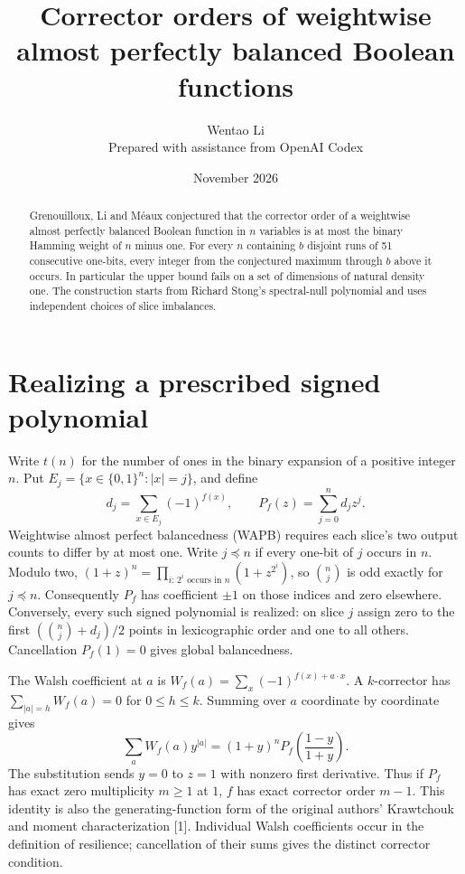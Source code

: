 \documentclass[11pt]{article}
\title{Corrector orders of weightwise almost perfectly balanced Boolean functions}
\author{Wentao Li\\[2pt]\small Prepared with assistance from OpenAI Codex}
\date{November 2026}
\begin{document}
\maketitle
\begin{abstract}
Grenouilloux, Li and M\'eaux conjectured that the corrector order of a weightwise almost perfectly balanced Boolean function in $n$ variables is at most the binary Hamming weight of $n$ minus one. For every $n$ containing $b$ disjoint runs of 51 consecutive one-bits, every integer from the conjectured maximum through $b$ above it occurs. In particular the upper bound fails on a set of dimensions of natural density one. The construction starts from Richard Stong's spectral-null polynomial and uses independent choices of slice imbalances.
\end{abstract}

\section{Realizing a prescribed signed polynomial}
Write $t(n)$ for the number of ones in the binary expansion of a positive integer $n$. Put $E_j=\{x\in\{0,1\}^n:|x|=j\}$, and define
\[
d_j=\sum_{x\in E_j}(-1)^{f(x)},\qquad P_f(z)=\sum_{j=0}^n d_jz^j.
\]
Weightwise almost perfect balancedness (WAPB) requires each slice's two output counts to differ by at most one. Write $j\preceq n$ if every one-bit of $j$ occurs in $n$. Modulo two, $(1+z)^n=\prod_{i:\,2^i\text{ occurs in }n}(1+z^{2^i})$, so $\binom nj$ is odd exactly for $j\preceq n$. Consequently $P_f$ has coefficient $\pm1$ on those indices and zero elsewhere. Conversely, every such signed polynomial is realized: on slice $j$ assign zero to the first $(\binom nj+d_j)/2$ points in lexicographic order and one to all others. Cancellation $P_f(1)=0$ gives global balancedness.

The Walsh coefficient at $a$ is $W_f(a)=\sum_x(-1)^{f(x)+a\cdot x}$. A $k$-corrector has $\sum_{|a|=h}W_f(a)=0$ for $0\le h\le k$. Summing over $a$ coordinate by coordinate gives
\[
\sum_{a} W_f(a)y^{|a|}=(1+y)^n P_f\!\left(\frac{1-y}{1+y}\right).
\]
The substitution sends $y=0$ to $z=1$ with nonzero first derivative. Thus if $P_f$ has exact zero multiplicity $m\ge1$ at $1$, $f$ has exact corrector order $m-1$. This identity is also the generating-function form of the original authors' Krawtchouk and moment characterization [1]. Individual Walsh coefficients occur in the definition of resilience; cancellation of their sums gives the distinct corrector condition.
\end{document}

